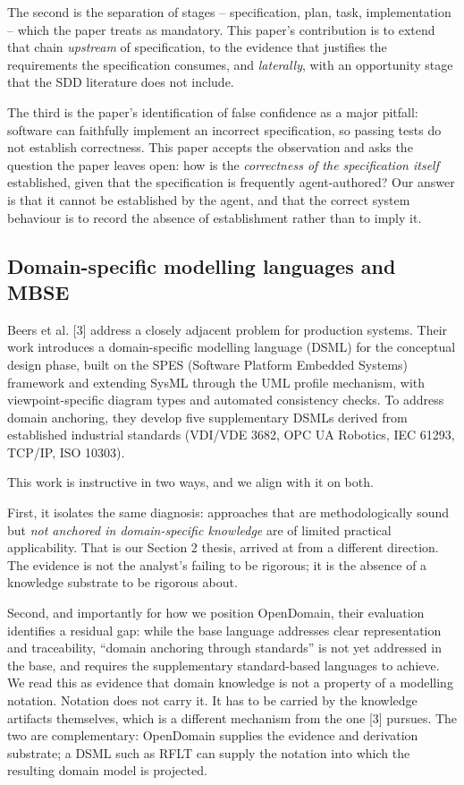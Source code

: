 \documentclass[11pt,a4paper]{article}
\begin{document}
The second is the separation of stages -- specification, plan, task, implementation -- which the paper treats as mandatory. This paper's contribution is to extend that chain \emph{upstream} of specification, to the evidence that justifies the requirements the specification consumes, and \emph{laterally}, with an opportunity stage that the SDD literature does not include.

The third is the paper's identification of false confidence as a major pitfall: software can faithfully implement an incorrect specification, so passing tests do not establish correctness. This paper accepts the observation and asks the question the paper leaves open: how is the \emph{correctness of the specification itself} established, given that the specification is frequently agent-authored? Our answer is that it cannot be established by the agent, and that the correct system behaviour is to record the absence of establishment rather than to imply it.

\subsection{Domain-specific modelling languages and MBSE}

Beers et al. [3] address a closely adjacent problem for production systems. Their work introduces a domain-specific modelling language (DSML) for the conceptual design phase, built on the SPES (Software Platform Embedded Systems) framework and extending SysML through the UML profile mechanism, with viewpoint-specific diagram types and automated consistency checks. To address domain anchoring, they develop five supplementary DSMLs derived from established industrial standards (VDI/VDE 3682, OPC UA Robotics, IEC 61293, TCP/IP, ISO 10303).

This work is instructive in two ways, and we align with it on both.

First, it isolates the same diagnosis: approaches that are methodologically sound but \emph{not anchored in domain-specific knowledge} are of limited practical applicability. That is our Section 2 thesis, arrived at from a different direction. The evidence is not the analyst's failing to be rigorous; it is the absence of a knowledge substrate to be rigorous about.

Second, and importantly for how we position OpenDomain, their evaluation identifies a residual gap: while the base language addresses clear representation and traceability, ``domain anchoring through standards'' is not yet addressed in the base, and requires the supplementary standard-based languages to achieve. We read this as evidence that domain knowledge is not a property of a modelling notation. Notation does not carry it. It has to be carried by the knowledge artifacts themselves, which is a different mechanism from the one [3] pursues. The two are complementary: OpenDomain supplies the evidence and derivation substrate; a DSML such as RFLT can supply the notation into which the resulting domain model is projected.
\end{document}
